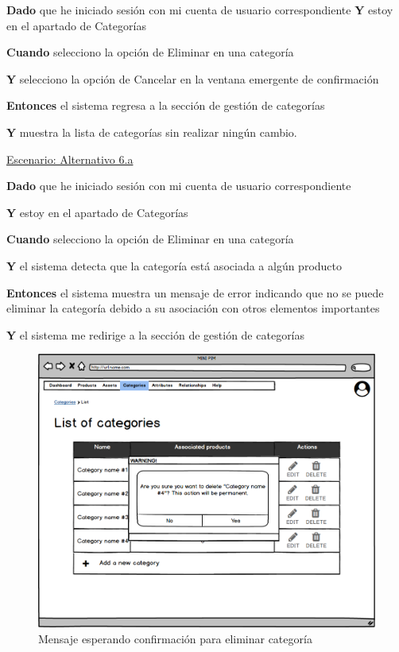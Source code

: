 \textbf{Dado} que he iniciado sesión con mi cuenta de usuario correspondiente
\textbf{Y} estoy en el apartado de Categorías\par
\textbf{Cuando} selecciono la opción de Eliminar en una categoría\par
\textbf{Y} selecciono la opción de Cancelar en la ventana emergente de confirmación\par
\textbf{Entonces} el sistema regresa a la sección de gestión de categorías\par
\textbf{Y} muestra la lista de categorías sin realizar ningún cambio.\par


\vspace{0.20cm}

\underline{Escenario: Alternativo 6.a}\par
\vspace{0.15cm}

\textbf{Dado} que he iniciado sesión con mi cuenta de usuario correspondiente\par
\textbf{Y} estoy en el apartado de Categorías\par
\textbf{Cuando} selecciono la opción de Eliminar en una categoría\par
\textbf{Y} el sistema detecta que la categoría está asociada a algún producto\par
\textbf{Entonces} el sistema muestra un mensaje de error indicando que no se puede eliminar la categoría debido a su asociación con otros elementos importantes\par
\textbf{Y} el sistema me redirige a la sección de gestión de categorías\par


\vspace{0.20cm}

\begin{figure}[H]
    \includegraphics[width=1\linewidth]{mockups/RF4.4_1.png}
    \caption{Mensaje esperando confirmación para eliminar categoría}
   \end{figure}
\vspace{1.0cm}

